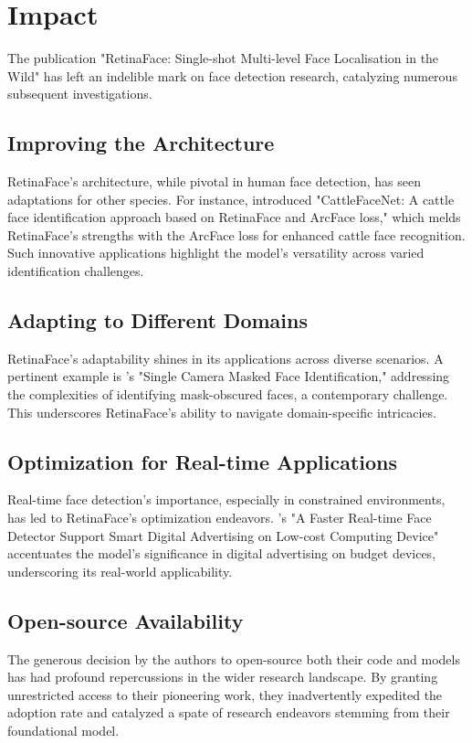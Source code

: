 \documentclass{article}
\begin{document}
\section{Impact}

The publication "RetinaFace: Single-shot Multi-level Face Localisation in the Wild" has left an indelible mark on face detection research, catalyzing numerous subsequent investigations.

\subsection{Improving the Architecture}
RetinaFace's architecture, while pivotal in human face detection, has seen adaptations for other species. For instance, \cite{xu2022cattlefacenet} introduced "CattleFaceNet: A cattle face identification approach based on RetinaFace and ArcFace loss," which melds RetinaFace's strengths with the ArcFace loss for enhanced cattle face recognition. Such innovative applications highlight the model's versatility across varied identification challenges.

\subsection{Adapting to Different Domains}
RetinaFace's adaptability shines in its applications across diverse scenarios. A pertinent example is \cite{aswal2020single}'s "Single Camera Masked Face Identification," addressing the complexities of identifying mask-obscured faces, a contemporary challenge. This underscores RetinaFace's ability to navigate domain-specific intricacies.

\subsection{Optimization for Real-time Applications}
Real-time face detection's importance, especially in constrained environments, has led to RetinaFace's optimization endeavors. \cite{putro2022faster}'s "A Faster Real-time Face Detector Support Smart Digital Advertising on Low-cost Computing Device" accentuates the model's significance in digital advertising on budget devices, underscoring its real-world applicability.

\subsection{Open-source Availability}

The generous decision by the authors to open-source both their code and models has had profound repercussions in the wider research landscape. By granting unrestricted access to their pioneering work, they inadvertently expedited the adoption rate and catalyzed a spate of research endeavors stemming from their foundational model.
\end{document}
